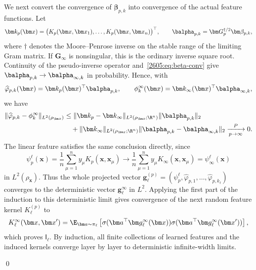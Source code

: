 We next convert the convergence of $\bm\beta_{p,k}$ into convergence of the actual feature functions.
Let
\[
    \bm k_p(\bm x)=\bigl(K_p(\bm x,\bm x_1),\dots,K_p(\bm x,\bm x_n)\bigr)^\top,
    \qquad
    \balpha_{p,k}=\bm G_p^{\dagger/2}\bm\beta_{p,k},
\]
where $\dagger$ denotes the Moore--Penrose inverse on the stable range of the limiting
Gram matrix. If $\bm G_\infty$ is nonsingular, this is the ordinary inverse square root. Continuity of the pseudo-inverse operator and~\eqref{2605:eq:beta-conv} give
$\balpha_{p,k}\to\balpha_{\infty,k}$ in probability. Hence, with
\[
    \widehat\varphi_{p,k}(\bm x)=\bm k_p(\bm x)^\top\balpha_{p,k},\qquad
    \phi^\infty_k(\bm x)=\bm k_\infty(\bm x)^\top\balpha_{\infty,k},
\]
we have
\begin{equation}
\begin{aligned}
    \|\widehat\varphi_{p,k}-\phi^\infty_k\|_{L^2(\rho_{\bm x})}
    &\leq
    \|\bm k_p-\bm k_\infty\|_{L^2(\rho_{\bm x};\R^n)} 
    \|\balpha_{p,k}\|_2 \\
    &\quad+
    \|\bm k_\infty\|_{L^2(\rho_{\bm x};\R^n)} 
    \|\balpha_{p,k}-\balpha_{\infty,k}\|_2
    \xrightarrow[p\to\infty]{P}0.
\end{aligned}
    \label{2605:eq:feature-function-conv}
\end{equation}
The linear feature satisfies the same conclusion directly, since
\[
    \psi_p^\ell(\bm x)
    =
    \frac1n\sum_{\mu=1}^n y_\mu K_p(\bm x,\bm x_\mu)
    \to
    \frac1n\sum_{\mu=1}^n y_\mu K_\infty(\bm x,\bm x_\mu)
    =
    \psi_\infty^\ell(\bm x)
\]
in $L^2(\rho_{\bm x})$. Thus the whole projected vector
$\bm g_\ell^{(p)}=(\psi_p^\ell,\widehat\varphi_{p,1},\dots,\widehat\varphi_{p,k_\ell})$
converges to the deterministic vector $\bm g_\ell^\infty$ in $L^2$. Applying the first
part of the induction to this deterministic limit gives convergence of the next random
feature kernel $K_\ell^{(p)}$ to
\[
    K_\ell^\infty(\bm x,\bm x')
    =
    \E_{\bm a\sim\pi_\ell}
    \left[
        \sigma(\bm a^\top\bm g_\ell^\infty(\bm x))
        \sigma(\bm a^\top\bm g_\ell^\infty(\bm x'))
    \right],
\]
which proves $\mathsf I_\ell$. By induction, all finite collections of learned features and
the induced kernels converge layer by layer to deterministic infinite-width limits.


 \qed
